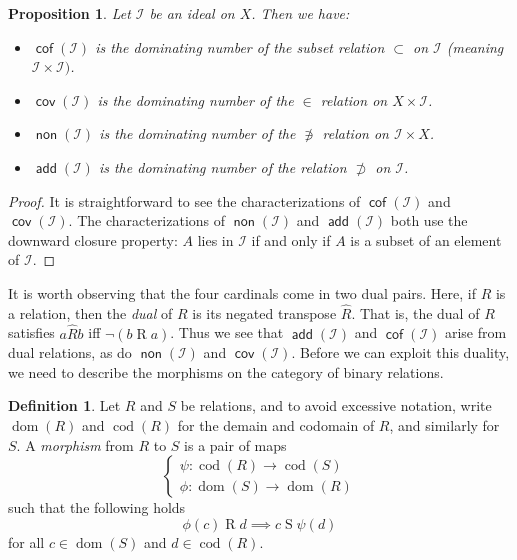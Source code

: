 \documentclass[11pt,oneside]{amsbook}
\DeclareMathOperator{\add}{\mathsf{add}}
\DeclareMathOperator{\non}{\mathsf{non}}
\DeclareMathOperator{\cov}{\mathsf{cov}}
\DeclareMathOperator{\cof}{\mathsf{cof}}
\DeclareMathOperator{\cod}{cod}
\DeclareMathOperator{\dom}{dom}
\theoremstyle{definition}
\theoremstyle{plain}
\newtheorem{prop}[thm]{Proposition}
\theoremstyle{definition}
\newtheorem{defn}[thm]{Definition}
\theoremstyle{remark}
\begin{document}
\begin{prop}
  Let $\mathcal I$ be an ideal on $X$. Then we have:
  \begin{itemize}
  \item $\cof(\mathcal I)$ is the dominating number of the subset relation $\subset$ on $\mathcal I$ (meaning $\mathcal I\times\mathcal I)$.
  \item $\cov(\mathcal I)$ is the dominating number of the $\in$ relation on $X\times\mathcal I$.
  \item $\non(\mathcal I)$ is the dominating number of the $\not\ni$ relation on $\mathcal I\times X$.
  \item $\add(\mathcal I)$ is the dominating number of the relation $\not\supset$ on $\mathcal I$.
  \end{itemize}
\end{prop}

\begin{proof}
  It is straightforward to see the characterizations of $\cof(\mathcal I)$ and $\cov(\mathcal I)$. The characterizations of $\non(\mathcal I)$ and $\add(\mathcal I)$ both use the downward closure property: $A$ lies in $\mathcal I$ if and only if $A$ is a subset of an element of $\mathcal I$.
\end{proof}

It is worth observing that the four cardinals come in two dual pairs. Here, if $R$ is a relation, then the \emph{dual} of $R$ is its negated transpose $\hat{R}$. That is, the dual of $R$ satisfies $a\mathrel{\hat{R}}b$ iff $\neg(b\mathrel Ra)$. Thus we see that $\add(\mathcal I)$ and $\cof(\mathcal I)$ arise from dual relations, as do $\non(\mathcal I)$ and $\cov(\mathcal I)$. Before we can exploit this duality, we need to describe the morphisms on the category of binary relations.

\begin{defn}
  Let $R$ and $S$ be relations, and to avoid excessive notation, write $\dom(R)$ and $\cod(R)$ for the demain and codomain of $R$, and similarly for $S$. A \emph{morphism} from $R$ to $S$ is a pair of maps
\[\begin{cases}\psi\colon\cod(R)\to\cod(S)\\\phi\colon\dom(S)\to\dom(R)\end{cases}
\]
such that the following holds
\[\phi(c)\mathrel{R}d\implies c\mathrel{S}\psi(d)
\]
for all $c\in\dom(S)$ and $d\in\cod(R)$.
\end{defn}
\end{document}
